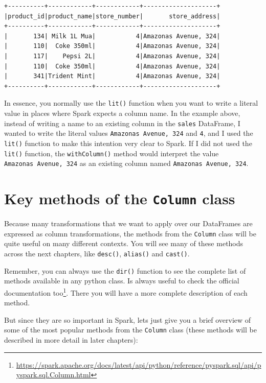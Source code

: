 \documentclass[
  11pt,
  letterpaper,
  DIV=11,
  numbers=noendperiod]{scrreprt}
\begin{document}
\begin{verbatim}
+----------+------------+------------+--------------------+
|product_id|product_name|store_number|       store_address|
+----------+------------+------------+--------------------+
|       134| Milk 1L Mua|           4|Amazonas Avenue, 324|
|       110|  Coke 350ml|           4|Amazonas Avenue, 324|
|       117|    Pepsi 2L|           4|Amazonas Avenue, 324|
|       110|  Coke 350ml|           4|Amazonas Avenue, 324|
|       341|Trident Mint|           4|Amazonas Avenue, 324|
+----------+------------+------------+--------------------+
\end{verbatim}

In essence, you normally use the \texttt{lit()} function when you want
to write a literal value in places where Spark expects a column name. In
the example above, instead of writing a name to an existing column in
the \texttt{sales} DataFrame, I wanted to write the literal values
\texttt{\textquotesingle{}Amazonas\ Avenue,\ 324\textquotesingle{}} and
\texttt{4}, and I used the \texttt{lit()} function to make this
intention very clear to Spark. If I did not used the \texttt{lit()}
function, the \texttt{withColumn()} method would interpret the value
\texttt{\textquotesingle{}Amazonas\ Avenue,\ 324\textquotesingle{}} as
an existing column named \texttt{Amazonas\ Avenue,\ 324}.

\section{\texorpdfstring{Key methods of the \texttt{Column}
class}{Key methods of the Column class}}\label{key-methods-of-the-column-class}

Because many transformations that we want to apply over our DataFrames
are expressed as column transformations, the methods from the
\texttt{Column} class will be quite useful on many different contexts.
You will see many of these methods across the next chapters, like
\texttt{desc()}, \texttt{alias()} and \texttt{cast()}.

Remember, you can always use the \texttt{dir()} function to see the
complete list of methods available in any python class. Is always useful
to check the official documentation too\footnote{\url{https://spark.apache.org/docs/latest/api/python/reference/pyspark.sql/api/pyspark.sql.Column.html}}.
There you will have a more complete description of each method.

But since they are so important in Spark, lets just give you a brief
overview of some of the most popular methods from the \texttt{Column}
class (these methods will be described in more detail in later
chapters):
\end{document}
